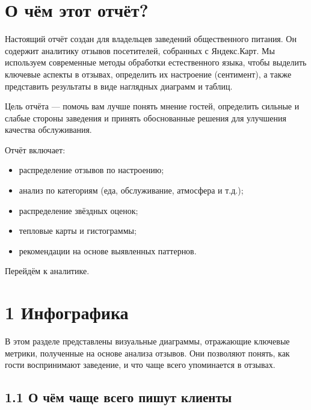 \documentclass[a4paper,12pt]{extarticle}
\begin{document}
\newpage
\section*{О чём этот отчёт?}
\vspace{1em}

Настоящий отчёт создан для владельцев заведений общественного питания. Он содержит аналитику отзывов посетителей, собранных с Яндекс.Карт.
Мы используем современные методы обработки естественного языка, чтобы выделить ключевые аспекты в отзывах, определить их настроение (сентимент), а также представить результаты в виде наглядных диаграмм и таблиц.

Цель отчёта — помочь вам лучше понять мнение гостей, определить сильные и слабые стороны заведения и принять обоснованные решения для улучшения качества обслуживания.

\vspace{2em}
Отчёт включает:
\begin{itemize}
    \item распределение отзывов по настроению;
    \item анализ по категориям (еда, обслуживание, атмосфера и т.д.);
    \item распределение звёздных оценок;
    \item тепловые карты и гистограммы;
    \item рекомендации на основе выявленных паттернов.
\end{itemize}

\vspace{1em}
Перейдём к аналитике.

\newpage
\section*{1 Инфографика}
В этом разделе представлены визуальные диаграммы, отражающие ключевые метрики, полученные на основе анализа отзывов.
Они позволяют понять, как гости воспринимают заведение, и что чаще всего упоминается в отзывах.

\subsection*{1.1 О чём чаще всего пишут клиенты}
\end{document}

